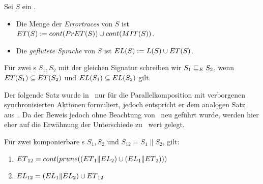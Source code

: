 \begin{Def}
  \label{DefETEL}
  Sei $S$ ein \EIO{}.
  \begin{itemize}
    \item Die Menge der \emph{Errortraces} von $S$ ist $ET{}(S):=cont{}(PrET{}(S))\cup
      cont{}(MIT{}(S))$.
    \item Die \emph{geflutete Sprache} von $S$ ist $EL{}(S):=L(S)\cup ET{}(S)$.
  \end{itemize}
  Für zwei \EIO{}s $S_1, S_2$ mit der gleichen Signatur schreiben wir
  $S_1\sqsubseteq _E S_2$, wenn $ET{}(S_1)\subseteq ET{}(S_2)$ und
  $EL{}(S_1)\subseteq EL{}(S_2)$ gilt.
\end{Def}

Der folgende Satz wurde in~\cite{Vogler2014EIO} nur für die Parallelkomposition
mit verborgenen synchronisierten Aktionen formuliert, jedoch entspricht er dem
analogen Satz aus~\cite{Schlosser2012BA}. Da der Beweis jedoch ohne Beachtung
von~\cite{Schlosser2012BA} neu geführt wurde, werden hier eher auf die
Erwähnung der Unterschiede zu~\cite{Vogler2014EIO} wert gelegt.

\begin{satz}
  \label{satzErrorSemanik}
  Für zwei komponierbare \EIO{}s $S_1, S_2$ und $S_{12}=S_1\|S_2$, gilt:
  \begin{enumerate}
    \item $ET{}_{12}=cont{}(prune{}((ET{}_1\|EL{}_2)\cup(EL{}_1\|ET{}_2)))$
    \item $EL{}_{12}=(EL{}_1\|EL{}_2)\cup ET{}_{12}$
  \end{enumerate}
\end{satz}

